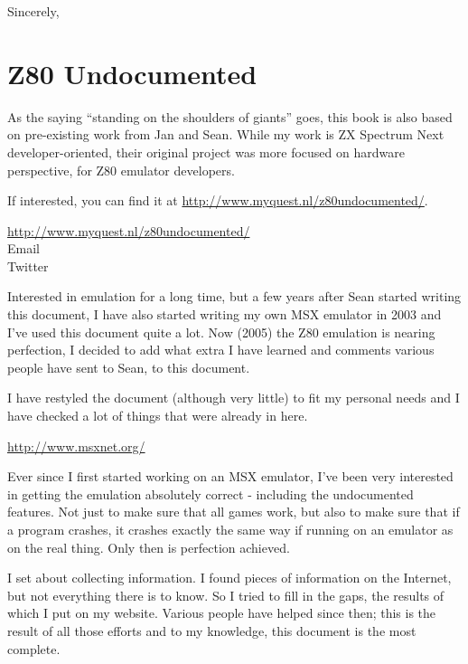 Sincerely, \AuthorName


\pagebreak
\section{Z80 Undocumented}

As the saying ``standing on the shoulders of giants'' goes, this book is also based on pre-existing work from Jan and Sean. While my work is ZX Spectrum Next developer-oriented, their original project was more focused on hardware perspective, for Z80 emulator developers.

If interested, you can find it at \url{http://www.myquest.nl/z80undocumented/}.

\begin{description}[style=unboxed,leftmargin=0cm]
	\item[Jan]\hfill
	
	\url{http://www.myquest.nl/z80undocumented/}\\
	Email \\
	Twitter 

	Interested in emulation for a long time, but a few years after Sean started writing this document, I have also started writing my own MSX emulator in 2003 and I've used this document quite a lot. Now (2005) the Z80 emulation is nearing perfection, I decided to add what extra I have learned and comments various people have sent to Sean, to this document.

	I have restyled the document (although very little) to fit my personal needs and I have checked a lot of things that were already in here.
 
	\item[Sean]\hfill

	\url{http://www.msxnet.org/}
	
	Ever since I first started working on an MSX emulator, I've been very interested in getting the emulation absolutely correct - including the undocumented features. Not just to make sure that all games work, but also to make sure that if a program crashes, it crashes exactly the same way if running on an emulator as on the real thing. Only then is perfection achieved.

	I set about collecting information. I found pieces of information on the Internet, but not everything there is to know. So I tried to fill in the gaps, the results of which I put on my website. Various people have helped since then; this is the result of all those efforts and to my knowledge, this document is the most complete.
\end{description}


